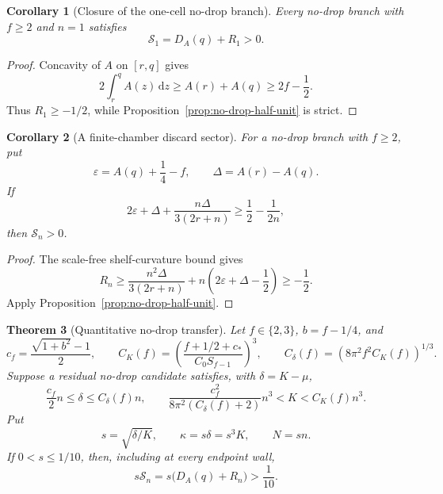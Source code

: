 \documentclass[11pt]{article}
\newtheorem{theorem}{Theorem}[section]
\newtheorem{corollary}[theorem]{Corollary}
\theoremstyle{remark}
\newcommand{\dd}{\,\mathrm d}
\begin{document}
\begin{corollary}[Closure of the one-cell no-drop branch]
\label{cor:no-drop-n-one}
Every no-drop branch with $f\geq2$ and $n=1$ satisfies
\begin{equation}
 \boxed{\mathcal S_1=D_A(q)+R_1>0.}
 \label{eq:no-drop-n-one}
\end{equation}
\end{corollary}

\begin{proof}
Concavity of $A$ on $[r,q]$ gives
\[
 2\int_r^qA(z)\dd z\geq A(r)+A(q)\geq2f-\frac12.
\]
Thus $R_1\geq-1/2$, while
Proposition~\ref{prop:no-drop-half-unit} is strict.
\end{proof}

\begin{corollary}[A finite-chamber discard sector]
\label{cor:no-drop-finite-discard}
For a no-drop branch with $f\geq2$, put
\[
 \varepsilon=A(q)+\frac14-f,\qquad
 \Delta=A(r)-A(q).
\]
If
\begin{equation}
 2\varepsilon+\Delta+
 \frac{n\Delta}{3(2r+n)}\geq\frac12-\frac1{2n},
 \label{eq:no-drop-finite-discard}
\end{equation}
then $\mathcal S_n>0$.
\end{corollary}

\begin{proof}
The scale-free shelf-curvature bound gives
\[
 R_n\geq\frac{n^2\Delta}{3(2r+n)}
 +n\left(2\varepsilon+\Delta-\frac12\right)\geq-\frac12.
\]
Apply Proposition~\ref{prop:no-drop-half-unit}.
\end{proof}

\begin{theorem}[Quantitative no-drop transfer]
\label{thm:quantitative-no-drop-transfer}
Let $f\in\{2,3\}$, $b=f-1/4$, and
\[
 c_f=\frac{\sqrt{1+b^2}-1}{2},\qquad
 C_K(f)=\left(\frac{f+1/2+c_*}{C_0S_{f-1}}\right)^3,\qquad
 C_\delta(f)=\left(8\pi^2f^2C_K(f)\right)^{1/3}.
\]
Suppose a residual no-drop candidate satisfies, with $\delta=K-\mu$,
\begin{equation}
 \frac{c_f}{2}n\leq\delta\leq C_\delta(f)n,\qquad
 \frac{c_f^2}{8\pi^2(C_\delta(f)+2)}n^3
 <K<C_K(f)n^3.
 \label{eq:quantitative-no-drop-cone}
\end{equation}
Put
\[
 s=\sqrt{\delta/K},\qquad \kappa=s\delta=s^3K,\qquad N=sn.
\]
If $0<s\leq1/10$, then, including at every endpoint wall,
\begin{equation}
 \boxed{s\mathcal S_n=s\bigl(D_A(q)+R_n\bigr)>\frac1{10}.}
 \label{eq:quantitative-no-drop-gap}
\end{equation}
\end{theorem}
\end{document}
